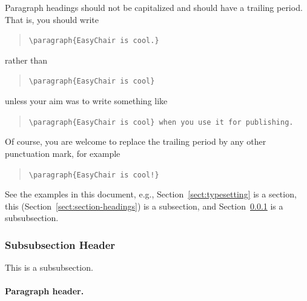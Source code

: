 \documentclass[EPiC]{easychair}
\begin{document}
Paragraph headings should not be capitalized and should have a
trailing period. That is, you should write

\begin{quote}
\verb|\paragraph{EasyChair is cool.}|
\end{quote}
rather than 

\begin{quote}
\verb|\paragraph{EasyChair is cool}|
\end{quote}
unless your aim was to write something like

\begin{quote}
\verb|\paragraph{EasyChair is cool} when you use it for publishing.| 
\end{quote}
Of course, you are welcome to replace the trailing period by any other
punctuation mark, for example 

\begin{quote}
\verb|\paragraph{EasyChair is cool!}|
\end{quote}

See the examples in this document, e.g.,
Section~\ref{sect:typesetting} is a section, this 
(Section~\ref{sect:section-headings}) is a subsection, and
Section~\ref{sect:subsubsection-headings} is a subsubsection.

\subsubsection{Subsubsection Header}
\label{sect:subsubsection-headings}

This is a subsubsection. 

\paragraph{Paragraph header.}
\end{document}
